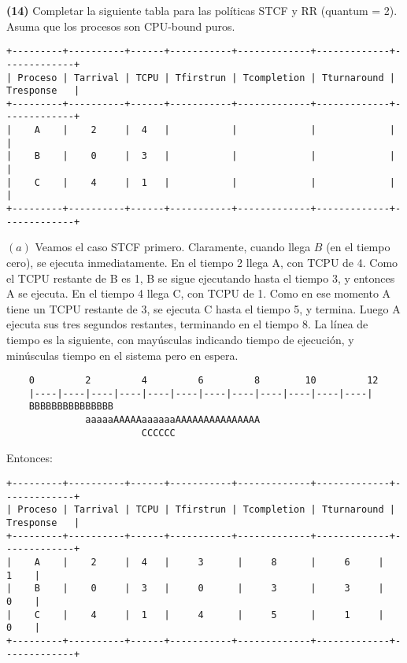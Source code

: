 \documentclass[12pt]{article}
\theoremstyle{definition}
\begin{document}
\begin{shaded}

    \textbf{(14)} Completar la siguiente tabla para las políticas STCF y RR (quantum =
    2). Asuma que los procesos son CPU-bound puros.

    \footnotesize
\begin{verbatim}
+---------+----------+------+-----------+-------------+-------------+-------------+
| Proceso | Tarrival | TCPU | Tfirstrun | Tcompletion | Tturnaround | Tresponse   |
+---------+----------+------+-----------+-------------+-------------+-------------+
|    A    |    2     |  4   |           |             |             |             |
|    B    |    0     |  3   |           |             |             |             |
|    C    |    4     |  1   |           |             |             |             |
+---------+----------+------+-----------+-------------+-------------+-------------+
\end{verbatim}
\normalsize
\end{shaded}

$(a)$ Veamos el caso STCF primero. Claramente, cuando llega $B$ (en el tiempo
cero), se ejecuta inmediatamente. En el tiempo 2 llega A, con TCPU de 4. Como el
TCPU restante de B es 1, B se sigue ejecutando hasta el tiempo 3, y entonces A
se ejecuta. En el tiempo 4 llega C, con TCPU de 1. Como en ese momento A tiene
un TCPU restante de 3, se ejecuta C hasta el tiempo 5, y termina. Luego A
ejecuta sus tres
segundos restantes, terminando en el tiempo 8. La línea de tiempo es la
siguiente, con mayúsculas indicando tiempo de ejecución, y minúsculas tiempo en
el sistema pero en espera.


\begin{verbatim}
    0         2         4         6         8        10         12
    |----|----|----|----|----|----|----|----|----|----|----|----|
    BBBBBBBBBBBBBBB
              aaaaaAAAAAaaaaaaAAAAAAAAAAAAAAA
                        CCCCCC
\end{verbatim}

Entonces:

    \footnotesize
\begin{verbatim}
+---------+----------+------+-----------+-------------+-------------+-------------+
| Proceso | Tarrival | TCPU | Tfirstrun | Tcompletion | Tturnaround | Tresponse   |
+---------+----------+------+-----------+-------------+-------------+-------------+
|    A    |    2     |  4   |     3      |     8      |     6     |     1    |
|    B    |    0     |  3   |     0      |     3      |     3     |     0    |
|    C    |    4     |  1   |     4      |     5      |     1     |     0    |
+---------+----------+------+-----------+-------------+-------------+-------------+
\end{verbatim}
\normalsize
\end{document}
